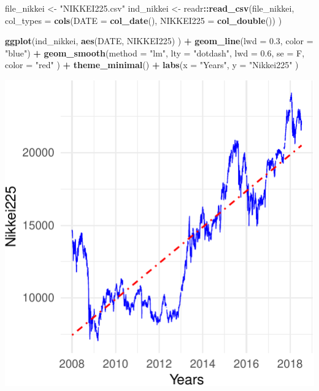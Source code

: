 \documentclass[11pt,]{article}
\newenvironment{Shaded}{\begin{snugshade}}{\end{snugshade}}
\newcommand{\KeywordTok}[1]{\textcolor[rgb]{0.13,0.29,0.53}{\textbf{#1}}}
\newcommand{\DataTypeTok}[1]{\textcolor[rgb]{0.13,0.29,0.53}{#1}}
\newcommand{\FloatTok}[1]{\textcolor[rgb]{0.00,0.00,0.81}{#1}}
\newcommand{\StringTok}[1]{\textcolor[rgb]{0.31,0.60,0.02}{#1}}
\newcommand{\OperatorTok}[1]{\textcolor[rgb]{0.81,0.36,0.00}{\textbf{#1}}}
\newcommand{\NormalTok}[1]{#1}
\begin{document}
\begin{Shaded}
\begin{Highlighting}[]
\NormalTok{file_nikkei <-}\StringTok{ "NIKKEI225.csv"}
\NormalTok{ind_nikkei <-}\StringTok{ }\NormalTok{readr}\OperatorTok{::}\KeywordTok{read_csv}\NormalTok{(file_nikkei, }
                             \DataTypeTok{col_types =} \KeywordTok{cols}\NormalTok{(}\DataTypeTok{DATE =} \KeywordTok{col_date}\NormalTok{(), }
                                              \DataTypeTok{NIKKEI225 =} \KeywordTok{col_double}\NormalTok{())}
\NormalTok{                             )}

\KeywordTok{ggplot}\NormalTok{(ind_nikkei, }
       \KeywordTok{aes}\NormalTok{(DATE, NIKKEI225)}
\NormalTok{       ) }\OperatorTok{+}
\StringTok{  }\KeywordTok{geom_line}\NormalTok{(}\DataTypeTok{lwd =} \FloatTok{0.3}\NormalTok{, }
            \DataTypeTok{color =} \StringTok{"blue"}\NormalTok{) }\OperatorTok{+}
\StringTok{  }\KeywordTok{geom_smooth}\NormalTok{(}\DataTypeTok{method =} \StringTok{"lm"}\NormalTok{,}
              \DataTypeTok{lty =} \StringTok{"dotdash"}\NormalTok{,}
              \DataTypeTok{lwd =} \FloatTok{0.6}\NormalTok{,}
              \DataTypeTok{se =}\NormalTok{ F,}
              \DataTypeTok{color =} \StringTok{"red"}
\NormalTok{              ) }\OperatorTok{+}
\StringTok{  }\KeywordTok{theme_minimal}\NormalTok{() }\OperatorTok{+}
\StringTok{  }\KeywordTok{labs}\NormalTok{(}\DataTypeTok{x =} \StringTok{"Years"}\NormalTok{,}
       \DataTypeTok{y =} \StringTok{"Nikkei225"}
\NormalTok{       )}
\end{Highlighting}
\end{Shaded}

\begin{center}\includegraphics{FMC_T4_PhD_Fin_Time_Series_files/figure-latex/Nikkei-1} \end{center}
\end{document}
